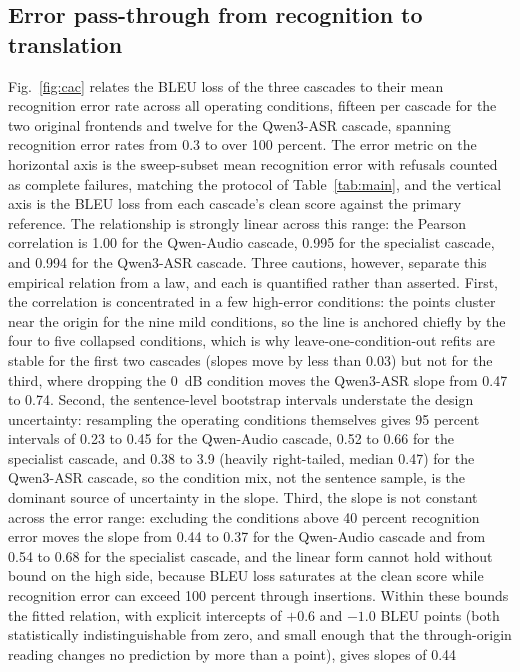 \subsection{Error pass-through from recognition to translation}
\label{sec:results:cac}

Fig.~\ref{fig:cac} relates the BLEU loss of the three cascades to their mean
recognition error rate across all operating conditions, fifteen per
cascade for the two original frontends and twelve for the Qwen3-ASR cascade,
spanning recognition error rates from 0.3 to over 100 percent. The error
metric on the horizontal axis is the sweep-subset mean recognition error
with refusals counted as complete failures, matching the protocol of
Table~\ref{tab:main}, and the vertical axis is the BLEU loss from each
cascade's clean score against the primary reference. The relationship is
strongly linear across this range: the Pearson correlation is 1.00 for the
Qwen-Audio cascade, 0.995 for the specialist cascade, and 0.994 for the
Qwen3-ASR cascade. Three cautions, however, separate this empirical
relation from a law, and each is quantified rather than asserted. First,
the correlation is concentrated in a few high-error conditions: the points
cluster near the origin for the nine mild conditions, so the line is
anchored chiefly by the four to five collapsed conditions, which is why
leave-one-condition-out refits are stable for the first two cascades
(slopes move by less than 0.03) but not for the third, where dropping the
0~dB condition moves the Qwen3-ASR slope from 0.47 to 0.74. Second, the
sentence-level bootstrap intervals understate the design uncertainty:
resampling the operating conditions themselves gives 95 percent intervals
of 0.23 to 0.45 for the Qwen-Audio cascade, 0.52 to 0.66 for the
specialist cascade, and 0.38 to 3.9 (heavily right-tailed, median 0.47)
for the Qwen3-ASR cascade, so the condition mix, not the sentence sample,
is the dominant source of uncertainty in the slope. Third, the slope is
not constant across the error range: excluding the conditions above 40
percent recognition error moves the slope from 0.44 to 0.37 for the
Qwen-Audio cascade and from 0.54 to 0.68 for the specialist cascade, and
the linear form cannot hold without bound on the high side, because BLEU
loss saturates at the clean score while recognition error can exceed 100
percent through insertions. Within these bounds the fitted relation, with
explicit intercepts of $+0.6$ and $-1.0$ BLEU points (both statistically
indistinguishable from zero, and small enough that the through-origin
reading changes no prediction by more than a point), gives slopes of 0.44
